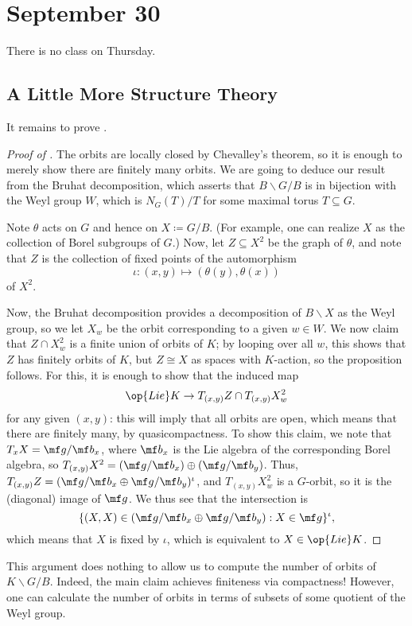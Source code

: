 \documentclass[../notes.tex]{subfiles}
\begin{document}
\section{September 30}
There is no class on Thursday.

\subsection{A Little More Structure Theory}
It remains to prove .
\begin{proof}[Proof of ]
	The orbits are locally closed by Chevalley's theorem, so it is enough to merely show there are finitely many orbits. We are going to deduce our result from the Bruhat decomposition, which asserts that $B\backslash G/B$ is in bijection with the Weyl group $W$, which is $N_G(T)/T$ for some maximal torus $T\subseteq G$.

	Note $\theta$ acts on $G$ and hence on $X\coloneqq G/B$. (For example, one can realize $X$ as the collection of Borel subgroups of $G$.) Now, let $Z\subseteq X^2$ be the graph of $\theta$, and note that $Z$ is the collection of fixed points of the automorphism
	\[\iota\colon(x,y)\mapsto(\theta(y),\theta(x))\]
	of $X^2$.

	Now, the Bruhat decomposition provides a decomposition of $B\backslash X$ as the Weyl group, so we let $X_w$ be the orbit corresponding to a given $w\in W$. We now claim that $Z\cap X_w^2$ is a finite union of orbits of $K$; by looping over all $w$, this shows that $Z$ has finitely orbits of $K$, but $Z\cong X$ as spaces with $K$-action, so the proposition follows. For this, it is enough to show that the induced map
	\[\op{Lie}K\to T_{(x,y)}Z\cap T_{(x,y)}X_w^2\]
	for any given $(x,y)$: this will imply that all orbits are open, which means that there are finitely many, by quasicompactness. To show this claim, we note that $T_xX=\mf g/\mf b_x$, where $\mf b_x$ is the Lie algebra of the corresponding Borel algebra, so $T_{(x,y)}X^2=(\mf g/\mf b_x)\oplus(\mf g/\mf b_y)$. Thus, $T_{(x,y)}Z=(\mf g/\mf b_x\oplus\mf g/\mf b_y)^\iota$, and $T_{(x,y)}X_w^2$ is a $G$-orbit, so it is the (diagonal) image of $\mf g$. We thus see that the intersection is
	\[\{(X,X)\in(\mf g/\mf b_x\oplus\mf g/\mf b_y):X\in\mf g\}^{\iota},\]
	which means that $X$ is fixed by $\iota$, which is equivalent to $X\in\op{Lie}K$.
\end{proof}
\begin{remark}
	This argument does nothing to allow us to compute the number of orbits of $K\backslash G/B$. Indeed, the main claim achieves finiteness via compactness! However, one can calculate the number of orbits in terms of subsets of some quotient of the Weyl group.
\end{remark}
\end{document}
